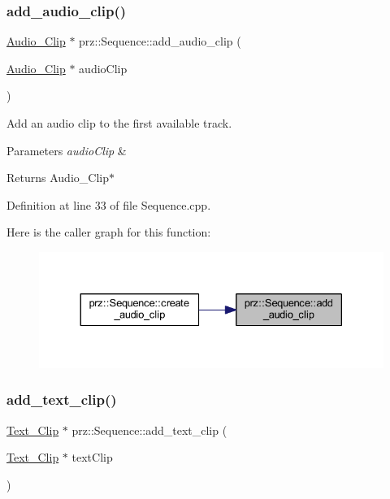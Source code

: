 \subsubsection{\texorpdfstring{add\_audio\_clip()}{add\_audio\_clip()}}
{\footnotesize\ttfamily \mbox{\hyperlink{classprz_1_1_audio___clip}{Audio\+\_\+\+Clip}} $\ast$ prz\+::\+Sequence\+::add\+\_\+audio\+\_\+clip (\begin{DoxyParamCaption}\item[{\mbox{\hyperlink{classprz_1_1_audio___clip}{Audio\+\_\+\+Clip}} $\ast$}]{audio\+Clip }\end{DoxyParamCaption})}



Add an audio clip to the first available track. 


\begin{DoxyParams}{Parameters}
{\em audio\+Clip} & \\
\hline
\end{DoxyParams}
\begin{DoxyReturn}{Returns}
Audio\+\_\+\+Clip$\ast$ 
\end{DoxyReturn}


Definition at line 33 of file Sequence.\+cpp.

Here is the caller graph for this function\+:
\nopagebreak
\begin{figure}[H]
\begin{center}
\leavevmode
\includegraphics[width=330pt]{classprz_1_1_sequence_a67a5cf8454902f91c6168516a3a04a75_icgraph}
\end{center}
\end{figure}
\mbox{\label{classprz_1_1_sequence_a66229b6f4cab505e8569e31dfe023e08}} 
\subsubsection{\texorpdfstring{add\_text\_clip()}{add\_text\_clip()}}
{\footnotesize\ttfamily \mbox{\hyperlink{classprz_1_1_text___clip}{Text\+\_\+\+Clip}} $\ast$ prz\+::\+Sequence\+::add\+\_\+text\+\_\+clip (\begin{DoxyParamCaption}\item[{\mbox{\hyperlink{classprz_1_1_text___clip}{Text\+\_\+\+Clip}} $\ast$}]{text\+Clip }\end{DoxyParamCaption})}



